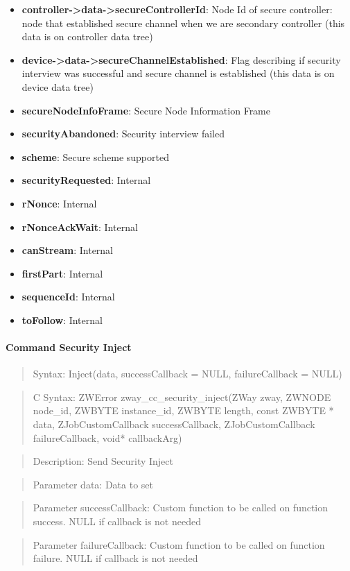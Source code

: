 \begin{itemize}
\item \textbf{controller->data->secureControllerId}: Node Id of secure controller: node that established secure channel when we are secondary controller (this data is on controller data tree)
\item \textbf{device->data->secureChannelEstablished}: Flag describing if security interview was successful and secure channel is established (this data is on device data tree)
\item \textbf{secureNodeInfoFrame}: Secure Node Information Frame
\item \textbf{securityAbandoned}: Security interview failed
\item \textbf{scheme}: Secure scheme supported
\item \textbf{securityRequested}: Internal
\item \textbf{rNonce}: Internal
\item \textbf{rNonceAckWait}: Internal
\item \textbf{canStream}: Internal
\item \textbf{firstPart}: Internal
\item \textbf{sequenceId}: Internal
\item \textbf{toFollow}: Internal
\end{itemize}

\paragraph{Command Security Inject}
\begin{quote}Syntax: Inject(data, successCallback = NULL, failureCallback = NULL)\end{quote}
\begin{quote}C Syntax: ZWError zway\_cc\_security\_inject(ZWay zway, ZWNODE node\_id, ZWBYTE instance\_id, ZWBYTE length, const ZWBYTE * data, ZJobCustomCallback successCallback, ZJobCustomCallback failureCallback, void* callbackArg)\end{quote}
\begin{quote}Description: Send Security Inject\end{quote}
\begin{quote}Parameter data: Data to set\end{quote}
\begin{quote}Parameter successCallback: Custom function to be called on function success. NULL if callback is not needed\end{quote}
\begin{quote}Parameter failureCallback: Custom function to be called on function failure. NULL if callback is not needed\end{quote}



